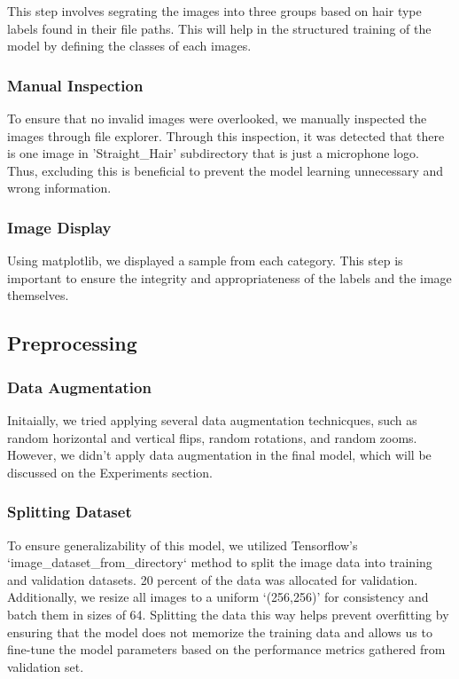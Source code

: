 This step involves segrating the images into three groups based on hair type labels found in their file paths. This will help in the structured training of the model by defining the classes of each images.

\subsubsection{Manual Inspection}

To ensure that no invalid images were overlooked, we manually inspected the images through file explorer. Through this inspection, it was detected that there is one image in 'Straight_Hair' subdirectory that is just a microphone logo. Thus, excluding this is beneficial to prevent the model learning unnecessary and wrong information.

\subsubsection{Image Display}

Using matplotlib, we displayed a sample from each category. This step is important to ensure the integrity and appropriateness of the labels and the image themselves.

\subsection{Preprocessing}

\subsubsection{Data Augmentation}

Initaially, we tried applying several data augmentation technicques, such as random horizontal and vertical flips, random rotations, and random zooms. However, we didn't apply data augmentation in the final model, which will be discussed on the Experiments section.

\subsubsection{Splitting Dataset}

To ensure generalizability of this model, we utilized Tensorflow's `image_dataset_from_directory` method to split the image data into training and validation datasets. 20 percent of the data was allocated for validation. Additionally, we resize all images to a uniform `(256,256)' for consistency and batch them in sizes of 64. Splitting the data this way helps prevent overfitting by ensuring that the model does not memorize the training data and allows us to fine-tune the model parameters based on the performance metrics gathered from validation set.

